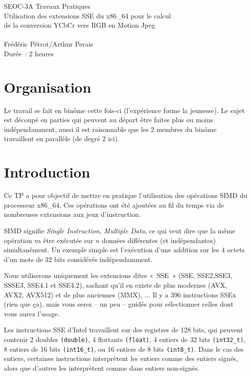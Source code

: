 \documentclass[a4paper,12pt]{article}
\begin{document}
\begin{center}
\Large
SEOC-3A Travaux Pratiques\\
Utilisation des extensions SSE du x86\_64 pour le calcul\\
de la conversion YCbCr vers RGB en Motion Jpeg\\~\\
\large
Frédéric Pétrot/Arthur Perais\\
Durée~: 2 heures
\end{center}

\section{Organisation}
Le travail se fait en binôme cette fois-ci (l'expérience forme la jeunesse).
Le sujet est découpé en parties qui peuvent au départ être faites plus ou moins indépendamment, aussi il est raisonnable que les 2 membres du binôme travaillent en parallèle (de degré 2 ici).


\section{Introduction}
Ce TP a pour objectif de mettre en pratique l'utilisation des opérations SIMD du processeur x86\_64. Ces opérations ont été ajoutées au fil du temps via de nombreuses extensions aux jeux d'instruction.

SIMD signifie \emph{Single Instruction, Multiple Data}, ce qui veut dire que la même opération va être exécutée sur $n$ données différentes (et indépendantes) simultanément.
Un exemple simple est l'exécution d'une addition sur les 4 octets d'un mots de 32 bits considérés indépendamment.

Nous utiliserons uniquement les extensions dites «~SSE~» (SSE, SSE2,SSE3, SSSE3, SSE4.1 et SSE4.2), sachant qu'il en existe de plus modernes (AVX, AVX2, AVX512) et de plus anciennes (MMX), ...
Il y a 396 instructions SSEx (rien que ça), mais vous serez -- un peu -- guidés pour sélectionner celles dont vous aurez l'usage.


Les instructions SSE d'Intel travaillent sur des registres de 128 bits, qui peuvent contenir 2 doubles \lstinline{(double)}, 4 flottants \lstinline{(float)}, 4 entiers de 32 bits \lstinline{(int32_t)}, 8 entiers de 16 bits \lstinline{(int16_t)}, ou 16 entiers de 8 bits \lstinline{(int8_t)}. Dans le cas des entiers, certaines instructions interprètent les entiers comme des entiers signés, alors que d'autres les interprètent comme dans entiers non-signés. 
	
\end{document}
